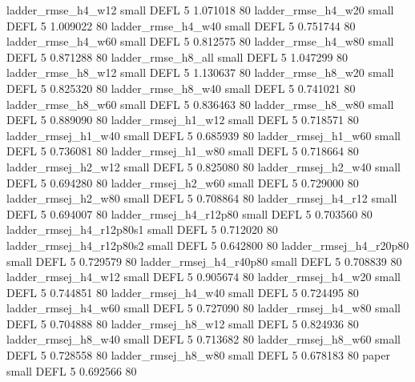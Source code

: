       ladder_rmse_h4_w12      small     DEFL                 5 1.071018 80
      ladder_rmse_h4_w20      small     DEFL                 5 1.009022 80
      ladder_rmse_h4_w40      small     DEFL                 5 0.751744 80
      ladder_rmse_h4_w60      small     DEFL                 5 0.812575 80
      ladder_rmse_h4_w80      small     DEFL                 5 0.871288 80
      ladder_rmse_h8_all      small     DEFL                 5 1.047299 80
      ladder_rmse_h8_w12      small     DEFL                 5 1.130637 80
      ladder_rmse_h8_w20      small     DEFL                 5 0.825320 80
      ladder_rmse_h8_w40      small     DEFL                 5 0.741021 80
      ladder_rmse_h8_w60      small     DEFL                 5 0.836463 80
      ladder_rmse_h8_w80      small     DEFL                 5 0.889090 80
     ladder_rmsej_h1_w12      small     DEFL                 5 0.718571 80
     ladder_rmsej_h1_w40      small     DEFL                 5 0.685939 80
     ladder_rmsej_h1_w60      small     DEFL                 5 0.736081 80
     ladder_rmsej_h1_w80      small     DEFL                 5 0.718664 80
     ladder_rmsej_h2_w12      small     DEFL                 5 0.825080 80
     ladder_rmsej_h2_w40      small     DEFL                 5 0.694280 80
     ladder_rmsej_h2_w60      small     DEFL                 5 0.729000 80
     ladder_rmsej_h2_w80      small     DEFL                 5 0.708864 80
     ladder_rmsej_h4_r12      small     DEFL                 5 0.694007 80
  ladder_rmsej_h4_r12p80      small     DEFL                 5 0.703560 80
ladder_rmsej_h4_r12p80s1      small     DEFL                 5 0.712020 80
ladder_rmsej_h4_r12p80s2      small     DEFL                 5 0.642800 80
  ladder_rmsej_h4_r20p80      small     DEFL                 5 0.729579 80
  ladder_rmsej_h4_r40p80      small     DEFL                 5 0.708839 80
     ladder_rmsej_h4_w12      small     DEFL                 5 0.905674 80
     ladder_rmsej_h4_w20      small     DEFL                 5 0.744851 80
     ladder_rmsej_h4_w40      small     DEFL                 5 0.724495 80
     ladder_rmsej_h4_w60      small     DEFL                 5 0.727090 80
     ladder_rmsej_h4_w80      small     DEFL                 5 0.704888 80
     ladder_rmsej_h8_w12      small     DEFL                 5 0.824936 80
     ladder_rmsej_h8_w40      small     DEFL                 5 0.713682 80
     ladder_rmsej_h8_w60      small     DEFL                 5 0.728558 80
     ladder_rmsej_h8_w80      small     DEFL                 5 0.678183 80
                   paper      small     DEFL                 5 0.692566 80
